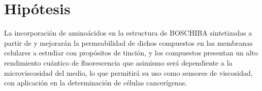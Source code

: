 \section{Hipótesis}

La incorporación de aminoácidos en la estructura de \gls{BOSCHIBA} sintetizadas a partir de  y  mejorarán la permeabilidad de dichos compuestos en las membranas celulares a estudiar con propósitos de tinción, y los compuestos presentan un alto rendimiento cuántico de fluorescencia que asimismo será dependiente a la microviscosidad del medio, lo que permitirá su uso como sensores de viscosidad, con aplicación en la determinación de células cancerígenas.